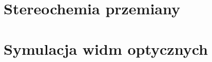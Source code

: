 \section{Stereochemia przemiany}\label{numeric:stereo}
\section{Symulacja widm optycznych}\label{numeric:spectra}
